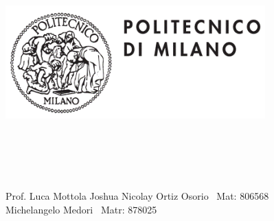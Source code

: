 \documentclass{article}
\begin{document}
\includegraphics[width=10cm, height=5cm]{logo} \break \break

\\

  \\
 \\

\break



\break \break

\break





\begin{flushright}


Prof. Luca Mottola\break 
Joshua Nicolay Ortiz Osorio \ Mat: 806568 \\
Michelangelo Medori \ Matr: 878025

\end{flushright}



  
  \newpage
  
\end{document}
